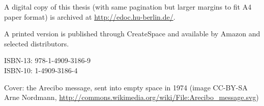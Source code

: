 \begin{titlepage}
\baselineskip

\noindent
A digital copy of this thesis (with same pagination but larger margins to fit
A4 paper format) is archived at \url{http://edoc.hu-berlin.de/}.

\baselineskip

\noindent
A printed version is published through CreateSpace and available by Amazon and
selected distributors.

\baselineskip

\noindent
ISBN-13: 978-1-4909-3186-9\\
ISBN-10: 1-4909-3186-4

\baselineskip\noindent
Cover: the Arecibo message, sent into empty space in 1974 (image
CC-BY-SA Arne Nordmann, \url{http://commons.wikimedia.org/wiki/File:Arecibo_message.svg})

\end{titlepage}

\makeatother
